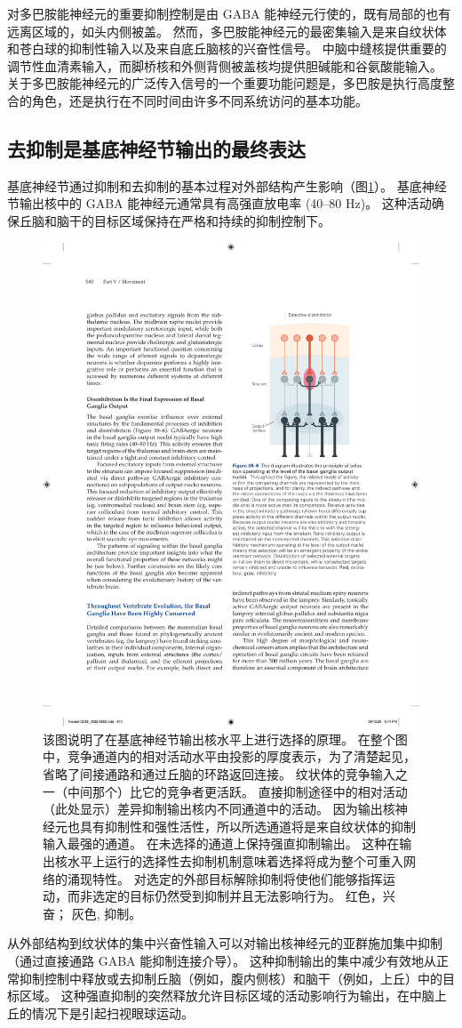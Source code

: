 对多巴胺能神经元的重要抑制控制是由 GABA 能神经元行使的，既有局部的也有远离区域的，如头内侧被盖。 然而，多巴胺能神经元的最密集输入是来自纹状体和苍白球的抑制性输入以及来自底丘脑核的兴奋性信号。 中脑中缝核提供重要的调节性血清素输入，而脚桥核和外侧背侧被盖核均提供胆碱能和谷氨酸能输入。 关于多巴胺能神经元的广泛传入信号的一个重要功能问题是，多巴胺是执行高度整合的角色，还是执行在不同时间由许多不同系统访问的基本功能。


\subsection{去抑制是基底神经节输出的最终表达}

基底神经节通过抑制和去抑制的基本过程对外部结构产生影响（图\ref{fig:38_6}）。 
基底神经节输出核中的 GABA 能神经元通常具有高强直放电率 (40–80 Hz)。 这种活动确保丘脑和脑干的目标区域保持在严格和持续的抑制控制下。

\begin{figure}[htbp]
	\centering
	\includegraphics[width=0.4\linewidth]{chap38/fig_38_6}
	\caption{该图说明了在基底神经节输出核水平上进行选择的原理。 在整个图中，竞争通道内的相对活动水平由投影的厚度表示，为了清楚起见，省略了间接通路和通过丘脑的环路返回连接。 纹状体的竞争输入之一（中间那个）比它的竞争者更活跃。 直接抑制途径中的相对活动（此处显示）差异抑制输出核内不同通道中的活动。 因为输出核神经元也具有抑制性和强性活性，所以所选通道将是来自纹状体的抑制输入最强的通道。 在未选择的通道上保持强直抑制输出。 这种在输出核水平上运行的选择性去抑制机制意味着选择将成为整个可重入网络的涌现特性。 对选定的外部目标解除抑制将使他们能够指挥运动，而非选定的目标仍然受到抑制并且无法影响行为。 红色，兴奋； 灰色, 抑制。}
	\label{fig:38_6}
\end{figure}

从外部结构到纹状体的集中兴奋性输入可以对输出核神经元的亚群施加集中抑制（通过直接通路 GABA 能抑制连接介导）。 这种抑制输出的集中减少有效地从正常抑制控制中释放或去抑制丘脑（例如，腹内侧核）和脑干（例如，上丘）中的目标区域。 这种强直抑制的突然释放允许目标区域的活动影响行为输出，在中脑上丘的情况下是引起扫视眼球运动。

